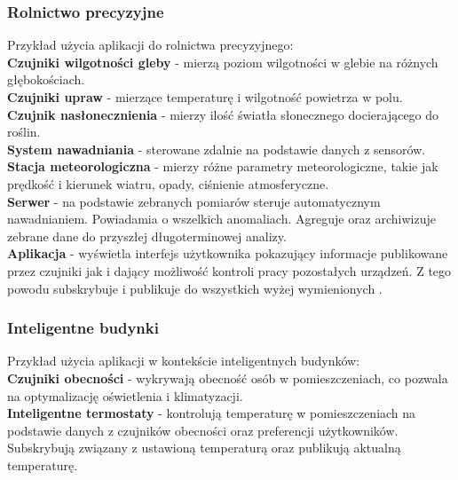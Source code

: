 \newpage

\subsubsection{Rolnictwo precyzyjne}
Przykład użycia aplikacji do rolnictwa precyzyjnego:\\

\textbf{Czujniki wilgotności gleby} - mierzą poziom wilgotności w glebie na różnych głębokościach.\\

\textbf{Czujniki upraw} - mierzące temperaturę i wilgotność powietrza w polu.\\

\textbf{Czujnik nasłonecznienia} - mierzy ilość światła słonecznego docierającego do roślin.\\

\textbf{System nawadniania} - sterowane zdalnie na podstawie danych z sensorów.\\

\textbf{Stacja meteorologiczna} - mierzy różne parametry meteorologiczne, takie jak prędkość i kierunek wiatru, opady, ciśnienie atmosferyczne.\\

\textbf{Serwer} - na podstawie zebranych pomiarów steruje automatycznym nawadnianiem. Powiadamia o wszelkich anomaliach. Agreguje oraz archiwizuje zebrane dane do przyszłej długoterminowej analizy.\\

\textbf{Aplikacja} - wyświetla interfejs użytkownika pokazujący informacje publikowane przez czujniki jak i dający możliwość kontroli pracy pozostałych urządzeń. Z tego powodu subskrybuje i publikuje do wszystkich wyżej wymienionych .\\

\newpage

\subsubsection{Inteligentne budynki}
Przykład użycia aplikacji w kontekście inteligentnych budynków:\\

\textbf{Czujniki obecności} - wykrywają obecność osób w pomieszczeniach, co pozwala na optymalizację oświetlenia i klimatyzacji.\\

\textbf{Inteligentne termostaty} - kontrolują temperaturę w pomieszczeniach na podstawie danych z czujników obecności oraz preferencji użytkowników. Subskrybują  związany z ustawioną temperaturą oraz publikują aktualną temperaturę.\\

